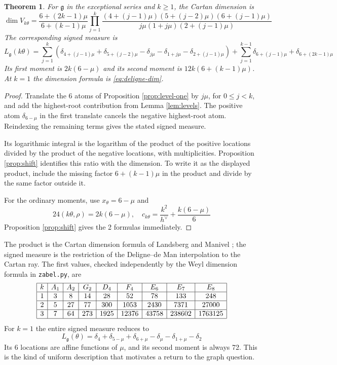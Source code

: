 \documentclass[11pt,reqno]{amsart}
\newtheorem{thm}{Theorem}[section]
\theoremstyle{definition}
\numberwithin{equation}{section}
\begin{document}
\begin{thm}\label{thm:cartan}
For $\mathfrak g$ in the exceptional series and $k\geq1$, the Cartan dimension is
$$\dim V_{k\theta}=\frac{6+(2k-1)\mu}{6+(k-1)\mu}\prod_{j=1}^k\frac{(4+(j-1)\mu)(5+(j-2)\mu)(6+(j-1)\mu)}{j\mu(1+j\mu)(2+(j-1)\mu)}$$
The corresponding signed measure is
$$L_{\mathfrak g}(k\theta)=\sum_{j=1}^k(\delta_{4+(j-1)\mu}+\delta_{5+(j-2)\mu}-\delta_{j\mu}-\delta_{1+j\mu}-\delta_{2+(j-1)\mu})+\sum_{j=1}^{k-1}\delta_{6+(j-1)\mu}+\delta_{6+(2k-1)\mu}$$
Its first moment is $2k(6-\mu)$ and its second moment is $12k(6+(k-1)\mu)$. At $k=1$ the dimension formula is \eqref{eq:deligne-dim}.
\end{thm}
\begin{proof}
Translate the 6 atoms of Proposition \ref{prop:level-one} by $j\mu$, for $0\leq j<k$, and add the highest-root contribution from Lemma \ref{lem:levels}. The positive atom $\delta_{6-\mu}$ in the first translate cancels the negative highest-root atom. Reindexing the remaining terms gives the stated signed measure.

Its logarithmic integral is the logarithm of the product of the positive locations divided by the product of the negative locations, with multiplicities. Proposition \ref{prop:shift} identifies this ratio with the dimension. To write it as the displayed product, include the missing factor $6+(k-1)\mu$ in the product and divide by the same factor outside it.

For the ordinary moments, use $x_\theta=6-\mu$ and
$$24(k\theta,\rho)=2k(6-\mu),\quad c_{k\theta}=\frac{k^2}{h^\vee}+\frac{k(6-\mu)}6$$
Proposition \ref{prop:shift} gives the 2 formulas immediately.
\end{proof}

The product is the Cartan dimension formula of Landsberg and Manivel \cite{LM02}; the signed measure is the restriction of the Deligne--de Man interpolation \cite{DDM96} to the Cartan ray. The first values, checked independently by the Weyl dimension formula in \texttt{zabel.py}, are
$$\begin{array}{|c|c|c|c|c|c|c|c|c|}\hline
k&A_1&A_2&G_2&D_4&F_4&E_6&E_7&E_8\\\hline
1&3&8&14&28&52&78&133&248\\\hline
2&5&27&77&300&1053&2430&7371&27000\\\hline
3&7&64&273&1925&12376&43758&238602&1763125\\\hline
\end{array}$$
For $k=1$ the entire signed measure reduces to
$$L_{\mathfrak g}(\theta)=\delta_4+\delta_{5-\mu}+\delta_{6+\mu}-\delta_\mu-\delta_{1+\mu}-\delta_2$$
Its 6 locations are affine functions of $\mu$, and its second moment is always 72. This is the kind of uniform description that motivates a return to the graph question.
\end{document}
